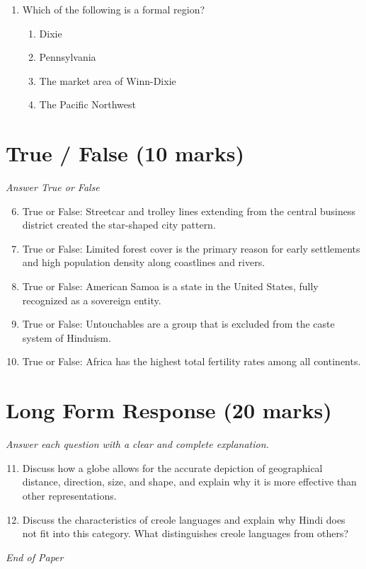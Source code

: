 \documentclass[12pt]{article}
\begin{document}
\begin{enumerate}[label=\arabic*.]
\begin{enumerate}[label=(\alph*)]
    \item Improved automobiles made transportation easier and less limited.
\end{enumerate}
\item Which of the following is a formal region?
\begin{enumerate}[label=(\alph*)]
    \item Dixie
    \item Pennsylvania
    \item The market area of Winn-Dixie
    \item The Pacific Northwest
\end{enumerate}
\end{enumerate}

\section*{True / False (10 marks)}
\textit{Answer True or False}
\begin{enumerate}[label=\arabic*.]
\setcounter{enumi}{5}
\item True or False: Streetcar and trolley lines extending from the central business district created the star-shaped city pattern.
\item True or False: Limited forest cover is the primary reason for early settlements and high population density along coastlines and rivers.
\item True or False: American Samoa is a state in the United States, fully recognized as a sovereign entity.
\item True or False: Untouchables are a group that is excluded from the caste system of Hinduism.
\item True or False: Africa has the highest total fertility rates among all continents.
\end{enumerate}

\section*{Long Form Response (20 marks)}
\textit{Answer each question with a clear and complete explanation.}
\begin{enumerate}[label=\arabic*.]
\setcounter{enumi}{10}
\item Discuss how a globe allows for the accurate depiction of geographical distance, direction, size, and shape, and explain why it is more effective than other representations.
\item Discuss the characteristics of creole languages and explain why Hindi does not fit into this category. What distinguishes creole languages from others?
\end{enumerate}

\vfill
\noindent\textit{End of Paper}
\end{document}

